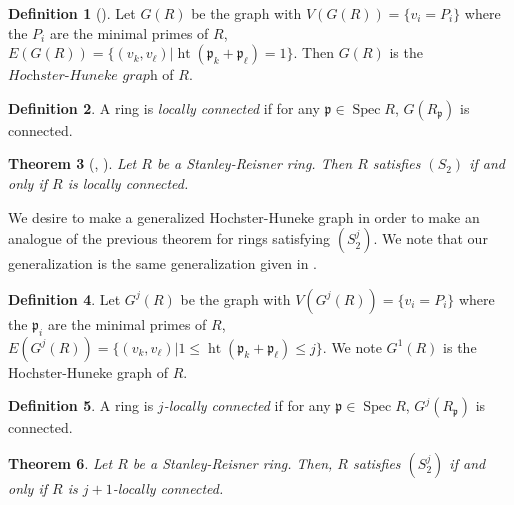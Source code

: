 \documentclass[11pt]{amsart}
\numberwithin{equation}{section}
\newtheorem{theorem}{Theorem}[section]
\theoremstyle{definition}
\newtheorem{defn}[theorem]{Definition}
\theoremstyle{remark}
\newcommand{\Spec}{\operatorname{Spec}}
\newcommand{\height}{\operatorname{ht}}
\begin{document}
\begin{defn}[\cite{HH94}]
Let $G (R)$ be the graph with $V(G (R)) = \{ v_i = P_i \}$ where the $P_i$ are the minimal primes of $R$, $E(G (R)) = \{ (v_k, v_\ell) | \height (\mathfrak{p}_k + \mathfrak{p}_\ell) = 1 \}$. Then $G(R)$ is the $\textit{Hochster-Huneke}$ $\textit{graph}$ of $R$.
\end{defn}

\begin{defn}
A ring is \textit{locally connected} if for any $\mathfrak{p} \in \Spec R$, $G(R_\mathfrak{p})$ is connected.
\end{defn}

\begin{theorem}[{\cite[Theorem 6.1.5]{Ku08}, \cite[Theorem 2.15]{Ho16}}]
Let $R$ be a Stanley-Reisner ring. Then $R$ satisfies $(S_2)$ if and only if $R$ is locally connected.
\end{theorem}

We desire to make a generalized Hochster-Huneke graph in order to make an analogue of the previous theorem for rings satisfying $(S_2^j)$.  We note that our generalization is the same generalization given in \cite{NS17}.

\begin{defn}
Let $G^j(R)$ be the graph with $V(G^j(R)) = \{v_i = P_i \}$ where the $\mathfrak{p}_i$ are the minimal primes of $R$, $E(G^j(R)) = \{ (v_k, v_\ell) | 1 \leq \height (\mathfrak{p}_k + \mathfrak{p}_\ell) \leq j \}$. We note $G^1(R)$ is the Hochster-Huneke graph of $R$.
\end{defn}


\begin{defn}
A ring is \textit{$j$-locally connected} if for any $\mathfrak{p} \in \Spec R$, $G^{j}(R_\mathfrak{p})$ is connected.
\end{defn}

\begin{theorem}
Let $R$ be a Stanley-Reisner ring. Then, $R$ satisfies $(S_2^j)$ if and only if $R$ is $j+1$-locally connected.
\end{theorem}
\end{document}
